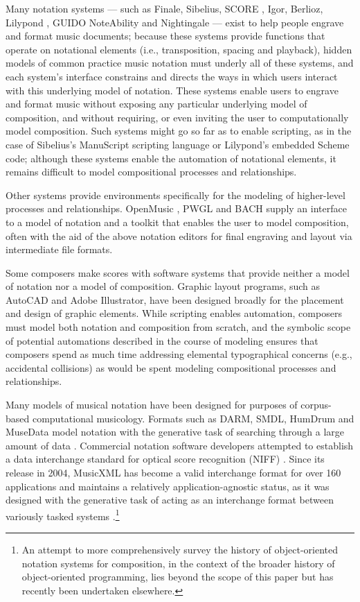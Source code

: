 \documentclass{article}
\begin{document}
Many notation systems --- such as Finale, Sibelius, SCORE \cite{Smith:1972mw},
Igor, Berlioz, Lilypond \cite{Nienhuys:2003ve}, GUIDO \cite{Hoos:1998bd}
NoteAbility \cite{hamel1noteability} and Nightingale --- exist to help people
engrave and format music documents; because these systems provide functions
that operate on notational elements (i.e., transposition, spacing and
playback), hidden models of common practice music notation must underly all of
these systems, and each system's interface constrains and directs the ways in
which users interact with this underlying model of notation. These systems
enable users to engrave and format music without exposing any particular
underlying model of composition, and without requiring, or even inviting the
user to computationally model composition. Such systems might go so far as to
enable scripting, as in the case of Sibelius's ManuScript \cite{Technology:qc}
scripting language or Lilypond's embedded Scheme code; although these systems
enable the automation of notational elements, it remains difficult to model
compositional processes and relationships.

Other systems provide environments specifically for the modeling of
higher-level processes and relationships. OpenMusic \cite{Assayag:1999sw}, PWGL
\cite{Laurson:2009qf} and BACH \cite{agostini2013real} supply an interface to
a model of notation and a toolkit that enables the user to model composition,
often with the aid of the above notation editors for final engraving and layout
via intermediate file formats.

Some composers make scores with software systems that provide neither a model
of notation nor a model of composition. Graphic layout programs, such as
AutoCAD and Adobe Illustrator, have been designed broadly for the placement and
design of graphic elements. While scripting enables automation, composers must
model both notation and composition from scratch, and the symbolic scope of
potential automations described in the course of modeling ensures that
composers spend as much time addressing elemental typographical concerns (e.g.,
accidental collisions) as would be spent modeling compositional processes and
relationships.

Many models of musical notation have been designed for purposes of
corpus-based computational musicology. Formats such as DARM, SMDL,
HumDrum and MuseData model notation with the generative task of searching
through a large amount of data \cite{Selfridge-Field:1997ud}. Commercial
notation software developers attempted to establish a data interchange standard
for optical score recognition (NIFF) \cite{niff1995niff}. Since its release in
2004, MusicXML has become a valid interchange format for over 160 applications
and maintains a relatively application-agnostic status, as it was designed with
the generative task of acting as an interchange format between variously tasked
systems \cite{Good:2001if}.\footnote{An attempt to more
comprehensively survey the history of object-oriented notation systems for
composition, in the context of the broader history of object-oriented
programming, lies beyond the scope of this paper but has recently been
undertaken elsewhere\cite{trevino2013compositional}.}
\end{document}
